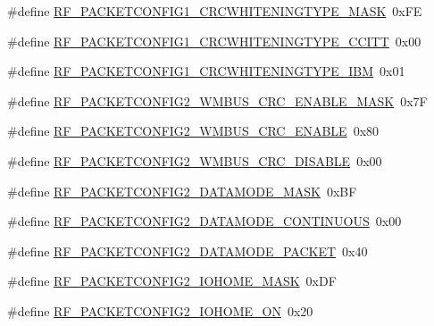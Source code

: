\begin{DoxyCompactItemize}
\item 
\#define \mbox{\hyperlink{sx1276_regs-_fsk_8h_a8062626f245aa20c2a325b831b908f0f}{R\+F\+\_\+\+P\+A\+C\+K\+E\+T\+C\+O\+N\+F\+I\+G1\+\_\+\+C\+R\+C\+W\+H\+I\+T\+E\+N\+I\+N\+G\+T\+Y\+P\+E\+\_\+\+M\+A\+SK}}~0x\+FE
\item 
\#define \mbox{\hyperlink{sx1276_regs-_fsk_8h_a618462d2aed522dc17aaa596d7dd982d}{R\+F\+\_\+\+P\+A\+C\+K\+E\+T\+C\+O\+N\+F\+I\+G1\+\_\+\+C\+R\+C\+W\+H\+I\+T\+E\+N\+I\+N\+G\+T\+Y\+P\+E\+\_\+\+C\+C\+I\+TT}}~0x00
\item 
\#define \mbox{\hyperlink{sx1276_regs-_fsk_8h_abb45d698c0e2e726d9754315bd4d3829}{R\+F\+\_\+\+P\+A\+C\+K\+E\+T\+C\+O\+N\+F\+I\+G1\+\_\+\+C\+R\+C\+W\+H\+I\+T\+E\+N\+I\+N\+G\+T\+Y\+P\+E\+\_\+\+I\+BM}}~0x01
\item 
\#define \mbox{\hyperlink{sx1276_regs-_fsk_8h_a57d39324128c8750f93dabdbdff3f22a}{R\+F\+\_\+\+P\+A\+C\+K\+E\+T\+C\+O\+N\+F\+I\+G2\+\_\+\+W\+M\+B\+U\+S\+\_\+\+C\+R\+C\+\_\+\+E\+N\+A\+B\+L\+E\+\_\+\+M\+A\+SK}}~0x7F
\item 
\#define \mbox{\hyperlink{sx1276_regs-_fsk_8h_a5c8e0ba4aa3a5fe54ad3bc55a8119856}{R\+F\+\_\+\+P\+A\+C\+K\+E\+T\+C\+O\+N\+F\+I\+G2\+\_\+\+W\+M\+B\+U\+S\+\_\+\+C\+R\+C\+\_\+\+E\+N\+A\+B\+LE}}~0x80
\item 
\#define \mbox{\hyperlink{sx1276_regs-_fsk_8h_aa806ad7df0d57492cde33c501aff3861}{R\+F\+\_\+\+P\+A\+C\+K\+E\+T\+C\+O\+N\+F\+I\+G2\+\_\+\+W\+M\+B\+U\+S\+\_\+\+C\+R\+C\+\_\+\+D\+I\+S\+A\+B\+LE}}~0x00
\item 
\#define \mbox{\hyperlink{sx1276_regs-_fsk_8h_abb4848f4bf2f260a572db2e1b7fa8f0b}{R\+F\+\_\+\+P\+A\+C\+K\+E\+T\+C\+O\+N\+F\+I\+G2\+\_\+\+D\+A\+T\+A\+M\+O\+D\+E\+\_\+\+M\+A\+SK}}~0x\+BF
\item 
\#define \mbox{\hyperlink{sx1276_regs-_fsk_8h_a4882838bfea73af51a7e1184a4fd5f6a}{R\+F\+\_\+\+P\+A\+C\+K\+E\+T\+C\+O\+N\+F\+I\+G2\+\_\+\+D\+A\+T\+A\+M\+O\+D\+E\+\_\+\+C\+O\+N\+T\+I\+N\+U\+O\+US}}~0x00
\item 
\#define \mbox{\hyperlink{sx1276_regs-_fsk_8h_a4796ee777b3c32fa2a8ae19b434a1b99}{R\+F\+\_\+\+P\+A\+C\+K\+E\+T\+C\+O\+N\+F\+I\+G2\+\_\+\+D\+A\+T\+A\+M\+O\+D\+E\+\_\+\+P\+A\+C\+K\+ET}}~0x40
\item 
\#define \mbox{\hyperlink{sx1276_regs-_fsk_8h_aec749b50706dc81b547897200273b2a6}{R\+F\+\_\+\+P\+A\+C\+K\+E\+T\+C\+O\+N\+F\+I\+G2\+\_\+\+I\+O\+H\+O\+M\+E\+\_\+\+M\+A\+SK}}~0x\+DF
\item 
\#define \mbox{\hyperlink{sx1276_regs-_fsk_8h_ab3fecfa9a81a7642916f87732b105c60}{R\+F\+\_\+\+P\+A\+C\+K\+E\+T\+C\+O\+N\+F\+I\+G2\+\_\+\+I\+O\+H\+O\+M\+E\+\_\+\+ON}}~0x20

\end{DoxyCompactItemize}
